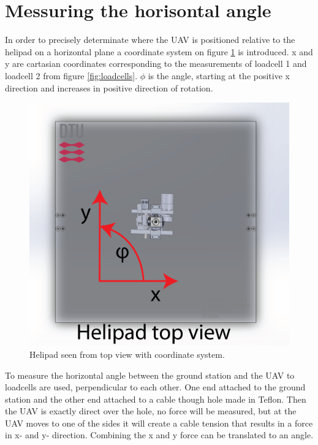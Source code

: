 \section{Messuring the horisontal angle}
\label{sec:horizontalAnglePrototype}
In order to precisely determinate where the UAV is positioned relative to the helipad on a horizontal plane a coordinate system on figure \ref{fig:top-coordinates} is introduced. x and y are cartasian coordinates corresponding to the measurements of loadcell 1 and loadcell 2 from figure \ref{fig:loadcells}. $\phi$ is the angle, starting at the positive x direction and increases in positive direction of rotation.

\begin{figure}[H]
\centering
\includegraphics[scale=0.75]{graphics/cad/top-coordinates.png}
\caption{Helipad seen from top view with coordinate system.}
\label{fig:top-coordinates}
\end{figure}

\noindent
To measure the horizontal angle between the ground station and the UAV to loadcells are used, perpendicular to each other. One end attached to the ground station and the other end attached to a cable though hole made in Teflon. Then the UAV is exactly direct over the hole, no force will be measured, but at the UAV moves to one of the sides it will create a cable tension that results in a force in x- and y- direction. Combining the x and y force can be translated to an angle. 

